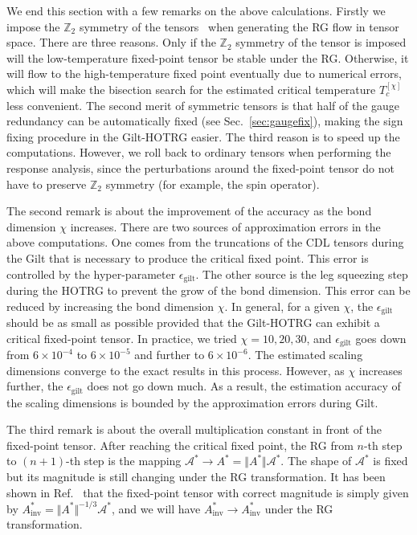 \documentclass[aps,prb,reprint,superscriptaddress,floatfix]{revtex4-2}
\begin{document}
We end this section with a few remarks on the above calculations. 
Firstly we impose the $\mathbb{Z}_2$ symmetry of the tensors~\cite{Singh2010SymTen, Singh2011U1Ten} when generating the RG flow in tensor space. 
There are three reasons. 
Only if the $\mathbb{Z}_2$ symmetry of the tensor is imposed will the low-temperature fixed-point tensor be stable under the RG.  
Otherwise, it will flow to the high-temperature fixed point eventually due to numerical errors, which will make the bisection search for the estimated critical temperature $T_c^{[\chi]}$ less convenient. 
The second merit of symmetric tensors is that half of the gauge redundancy can be automatically fixed (see Sec.~\ref{sec:gaugefix}), making the sign fixing procedure in the Gilt-HOTRG easier. 
The third reason is to speed up the computations. 
However, we roll back to ordinary tensors when performing the response analysis, since the perturbations around the fixed-point tensor do not have to preserve $\mathbb{Z}_2$ symmetry (for example, the spin operator). 
%

The second remark is about the improvement of the accuracy as the bond dimension $\chi$ increases. 
There are two sources of approximation errors in the above computations. 
One comes from the truncations of the CDL tensors during the Gilt that is necessary to produce the critical fixed point. 
This error is controlled by the hyper-parameter $\epsilon_{\text{gilt}}$. 
The other source is the leg squeezing step during the HOTRG to prevent the grow of the bond dimension.
This error can be reduced by increasing the bond dimension $\chi$. 
In general, for a given $\chi$, the $\epsilon_{\text{gilt}}$ should be as small as possible provided that the Gilt-HOTRG can exhibit a critical fixed-point tensor. 
In practice, we tried $\chi = 10, 20, 30$, and $\epsilon_{\text{gilt}}$ goes down from $6\times 10^{-4}$ to $6\times10^{-5}$ and further to $6\times10^{-6}$. 
The estimated scaling dimensions converge to the exact results in this process. 
However, as $\chi$ increases further, the $\epsilon_{\text{gilt}}$ does not go down much. 
As a result, the estimation accuracy of the scaling dimensions is bounded by the approximation errors during Gilt. 
%

The third remark is about the overall multiplication constant in front of the fixed-point tensor. 
After reaching the critical fixed point, the RG from $n$-th step to $(n+1)$-th step is the mapping $\mathcal{A}^{*}\rightarrow A^{*} = \Vert A^{*} \Vert \mathcal{A}^{*}$. 
The shape of $\mathcal{A}^*$ is fixed but its magnitude is still changing under the RG transformation. 
It has been shown in Ref.~\cite{GuWen2009} that the fixed-point tensor with correct magnitude is simply given by $A^*_{\text{inv}} = \Vert A^* \Vert^{-1/3} \mathcal{A}^*$, and we will have $A^*_{\text{inv}}\rightarrow A^*_{\text{inv}}$ under the RG transformation.
%
\end{document}
